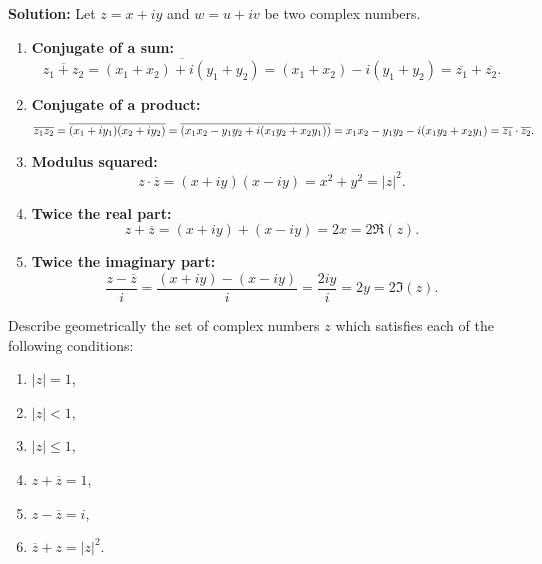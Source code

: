 \textbf{Solution:}
Let \( z = x + iy \) and \( w = u + iv \) be two complex numbers.

\begin{enumerate}[label=\alph*)]

\item \textbf{Conjugate of a sum:}
\[
\overline{z_1 + z_2} = \overline{(x_1 + x_2) + i(y_1 + y_2)} = (x_1 + x_2) - i(y_1 + y_2) = \overline{z_1} + \overline{z_2}.
\]

\item \textbf{Conjugate of a product:}
\[
\overline{z_1 z_2} = \overline{(x_1 + iy_1)(x_2 + iy_2)} = \overline{(x_1 x_2 - y_1 y_2 + i(x_1 y_2 + x_2 y_1))} \\
= x_1 x_2 - y_1 y_2 - i(x_1 y_2 + x_2 y_1) = \overline{z_1} \cdot \overline{z_2}.
\]

\item \textbf{Modulus squared:}
\[
z \cdot \overline{z} = (x + iy)(x - iy) = x^2 + y^2 = |z|^2.
\]

\item \textbf{Twice the real part:}
\[
z + \overline{z} = (x + iy) + (x - iy) = 2x = 2 \Re(z).
\]

\item \textbf{Twice the imaginary part:}
\[
\frac{z - \overline{z}}{i} = \frac{(x + iy) - (x - iy)}{i} = \frac{2iy}{i} = 2y = 2 \Im(z).
\]

\end{enumerate}

\begin{problembox}
Describe geometrically the set of complex numbers \( z \) which satisfies each of the following conditions:
\begin{enumerate}[label=\alph*)]
\item \( |z| = 1 \),
\item \( |z| < 1 \),
\item \( |z| \leq 1 \),
\item \( z + \overline{z} = 1 \),
\item \( z - \overline{z} = i \),
\item \( \overline{z} + z = |z|^2 \).
\end{enumerate}
\end{problembox}

